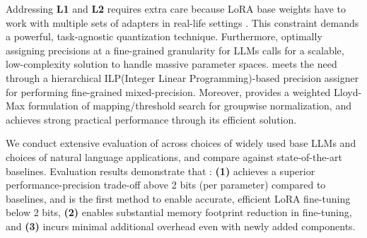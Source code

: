 Addressing \textbf{L1} and \textbf{L2} requires extra care because LoRA base weights have to work with multiple sets of adapters in real-life settings \cite{sheng2024slora,ostapenko2024towards,chen2024punica}. 
This constraint demands a powerful, task-agnostic quantization technique. 
Furthermore, optimally assigning precisions at a fine-grained granularity for LLMs calls for a scalable, low-complexity solution to handle massive parameter spaces. 
\FWName{} meets the need through a hierarchical ILP(Integer Linear Programming)-based precision assigner for performing fine-grained mixed-precision. 
Moreover, \FWName{} provides a weighted Lloyd-Max \cite{lloyd1982least,max1960quantizing}  formulation of mapping/threshold search for groupwise normalization, and achieves strong practical performance through its efficient solution.


We conduct extensive evaluation of \FWName{} across \nummodels{} choices of widely used base LLMs and \numdatasets{} choices of natural language applications, and compare \FWName against state-of-the-art baselines. 
Evaluation results demonstrate that \FWName: 
\textbf{(1)} achieves a superior performance-precision trade-off above 2 bits (per parameter) compared to baselines, and is the first method to enable accurate, efficient LoRA fine-tuning below 2 bits,
\textbf{(2)} enables substantial memory footprint reduction in fine-tuning, and
\textbf{(3)} incurs minimal additional overhead even with newly added components.

